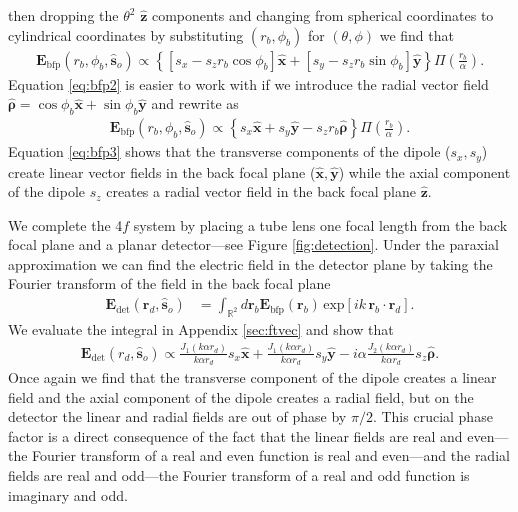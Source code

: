 \documentclass{osa-article}
\providecommand{\mb}[1]{\mathbf{#1}}
\providecommand{\so}{\mathbf{\hat{s}}_o}
\providecommand{\rb}{\mathbf{r}_b}
\providecommand{\rd}{\mathbf{r}_d}
\providecommand{\mh}[1]{\mathbf{\hat{#1}}}
\providecommand{\mbb}[1]{\mathbb{#1}}
\providecommand{\bs}[1]{\boldsymbol{#1}}
\begin{document}
then dropping the $\theta^2$ $\mh{z}$ components and changing from spherical
coordinates to cylindrical coordinates by substituting $(r_b, \phi_b)$ for
$(\theta, \phi)$ we find that
\begin{align}
  \mb{E}_{\text{bfp}}(r_b, \phi_b, \so{}) \propto \left\{\left[s_x - s_zr_b\cos\phi_b\right]\mh{x} + \left[s_y - s_z r_b\sin\phi_b\right]\mh{y}\right\}\Pi\left(\frac{r_b}{\alpha}\right). \label{eq:bfp2}
\end{align}
Equation \ref{eq:bfp2} is easier to work with if we introduce the radial vector
field $\mh{\bs{\rho}} = \cos\phi_b\mh{x} + \sin\phi_b\mh{y}$ and rewrite as
\begin{align}
  \mb{E}_{\text{bfp}}(r_b, \phi_b, \so{}) \propto \left\{s_x\mh{x} + s_y\mh{y} - s_z r_b \mh{\bs{\rho}}\right\}\Pi\left(\frac{r_b}{\alpha}\right). \label{eq:bfp3}
\end{align}
Equation \ref{eq:bfp3} shows that the transverse components of the dipole
($s_x, s_y$) create linear vector fields in the back focal plane
($\mh{x}, \mh{y}$) while the axial component of the dipole $s_z$ creates a radial
vector field in the back focal plane $\mh{z}$. 

We complete the 4$f$ system by placing a tube lens one focal length from the
back focal plane and a planar detector---see Figure \ref{fig:detection}. Under
the paraxial approximation we can find the electric field in the detector plane
by taking the Fourier transform of the field in the back focal plane
\cite{goodman1996}
\begin{align}
  \mb{E}_{\text{det}}(\rd{}, \so{}) &= \int_{\mbb{R}^2}d\rb{} \mb{E}_{\text{bfp}}(\rb{})\, \text{exp}\left[ik\,\rb{}\cdot\rd{}\right].\label{eq:det1}
\end{align}
We evaluate the integral in Appendix \ref{sec:ftvec} and show that 
\begin{align}
  \mb{E}_{\text{det}}(r_d, \so{}) \propto \frac{J_1(k\alpha r_d)}{k\alpha r_d}s_x\mh{x} + \frac{J_1(k\alpha r_d)}{k\alpha r_d}s_y\mh{y} - i\alpha\frac{J_2(k\alpha r_d)}{k\alpha r_d}s_z\mh{\bs{\rho}}.
\end{align}
Once again we find that the transverse component of the dipole creates a linear
field and the axial component of the dipole creates a radial field, but on the
detector the linear and radial fields are out of phase by $\pi/2$. This crucial
phase factor is a direct consequence of the fact that the linear fields are real
and even---the Fourier transform of a real and even function is real and
even---and the radial fields are real and odd---the Fourier transform of a real
and odd function is imaginary and odd.
\end{document}

